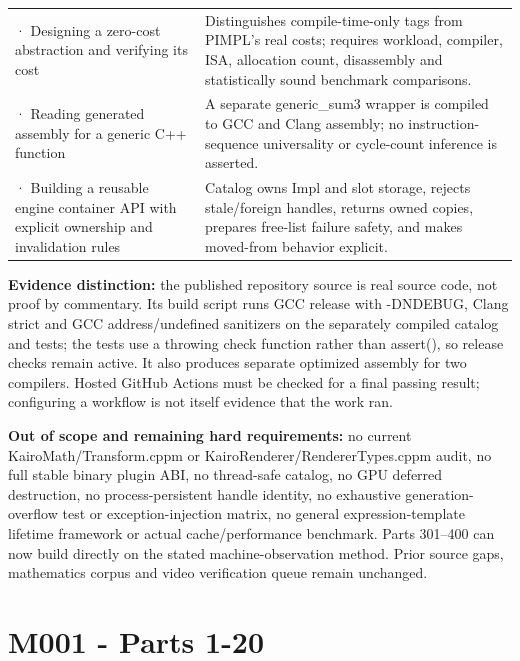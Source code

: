 {\begin{longtable}[]{@{}
  >{\raggedright\arraybackslash}p{}
  >{\raggedright\arraybackslash}p{}@{}}
298 · Designing a zero-cost abstraction and verifying its cost & Distinguishes compile-time-only tags from PIMPL's real costs; requires workload, compiler, ISA, allocation count, disassembly and statistically sound benchmark comparisons. \\
299 · Reading generated assembly for a generic C++ function & A separate generic\_sum3 wrapper is compiled to GCC and Clang assembly; no instruction-sequence universality or cycle-count inference is asserted. \\
300 · Building a reusable engine container API with explicit ownership and invalidation rules & Catalog owns Impl and slot storage, rejects stale/foreign handles, returns owned copies, prepares free-list failure safety, and makes moved-from behavior explicit. \\
\end{longtable}
}

\textbf{Evidence distinction:} the published repository source is real source code, not proof by commentary. Its build script runs GCC release with -DNDEBUG, Clang strict and GCC address/undefined sanitizers on the separately compiled catalog and tests; the tests use a throwing check function rather than assert(), so release checks remain active. It also produces separate optimized assembly for two compilers. Hosted GitHub Actions must be checked for a final passing result; configuring a workflow is not itself evidence that the work ran.

\textbf{Out of scope and remaining hard requirements:} no current KairoMath/Transform.cppm or KairoRenderer/RendererTypes.cppm audit, no full stable binary plugin ABI, no thread-safe catalog, no GPU deferred destruction, no process-persistent handle identity, no exhaustive generation-overflow test or exception-injection matrix, no general expression-template lifetime framework or actual cache/performance benchmark. Parts 301--400 can now build directly on the stated machine-observation method. Prior source gaps, mathematics corpus and video verification queue remain unchanged.

\section{M001 - Parts 1-20}\label{appendix-fd090d982a15-m001---parts-1-20}

